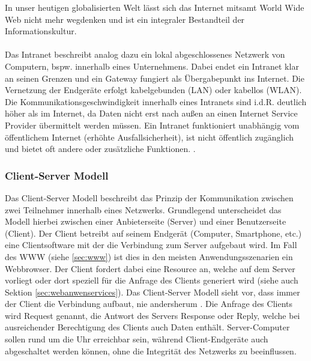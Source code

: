 In unser heutigen globalisierten Welt lässt sich das Internet mitsamt World Wide Web nicht mehr wegdenken und ist ein integraler Bestandteil der Informationskultur. 
 \\ \\
 Das Intranet beschreibt analog dazu ein lokal abgeschlossenes Netzwerk von Computern, bspw. innerhalb eines Unternehmens. Dabei endet ein Intranet klar an seinen Grenzen und ein Gateway fungiert als Übergabepunkt ins Internet. Die Vernetzung der Endgeräte erfolgt kabelgebunden (LAN) oder kabellos (WLAN). Die Kommunikationsgeschwindigkeit innerhalb eines Intranets sind i.d.R. deutlich höher als im Internet, da Daten nicht erst nach außen an einen Internet Service Provider übermittelt werden müssen. Ein Intranet funktioniert unabhängig vom öffentlichem Internet (erhöhte Ausfallsicherheit), ist nicht öffentlich zugänglich und bietet oft andere oder zusätzliche Funktionen. \cite{Intranet62:online}. 
 
 \subsubsection{Client-Server Modell}\label{sec:clientservermodell}
 Das Client-Server Modell beschreibt das Prinzip der Kommunikation zwischen zwei Teilnehmer innerhalb eines Netzwerks. Grundlegend unterscheidet das Modell hierbei zwischen einer Anbieterseite (Server) und einer Benutzerseite (Client). Der Client betreibt auf seinem Endgerät (Computer, Smartphone, etc.) eine Clientsoftware mit der die Verbindung zum Server aufgebaut wird. Im Fall des WWW (siehe \ref{sec:www}) ist dies in den meisten Anwendungsszenarien ein Webbrowser. Der Client fordert dabei eine Resource an, welche auf dem Server vorliegt oder dort speziell für die Anfrage des Clients generiert wird (siehe auch Sektion \ref{sec:webanwenservices}). Das Client-Server Modell sieht vor, dass immer der Client die Verbindung aufbaut, nie andersherum \cite{ElektronikKompendium.de:online}. Die Anfrage des Clients wird Request genannt, die Antwort des Servers Response oder Reply, welche bei ausreichender Berechtigung des Clients auch Daten enthält. 
 Server-Computer sollen rund um die Uhr erreichbar sein, während Client-Endgeräte auch abgeschaltet werden können, ohne die Integrität des Netzwerks zu beeinflussen. 
 
